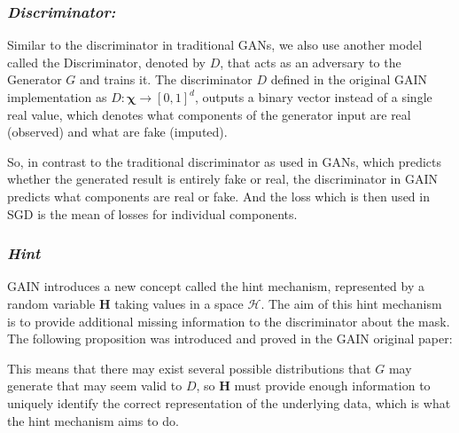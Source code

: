 \documentclass[conference]{IEEEtran}
\begin{document}
\subsubsection{\textit{Discriminator:}}

Similar to the discriminator in traditional GANs, we also use another model called the Discriminator, denoted by \( D \), that acts as an adversary to the Generator \( G \) and trains it. The discriminator \( D \) defined in the original GAIN implementation as \( D : \mathbf{\chi} \rightarrow [0,1]^d \), outputs a binary vector instead of a single real value, which denotes what components of the generator input are real (observed) and what are fake (imputed). 

So, in contrast to the traditional discriminator as used in GANs, which predicts whether the generated result is entirely fake or real, the discriminator in GAIN predicts what components are real or fake. And the loss which is then used in SGD is the mean of losses for individual components.

\subsubsection{\textit{Hint}}
GAIN introduces a new concept called the hint mechanism, represented by a random variable \( \mathbf{H} \) taking values in a space \( \mathcal{H} \). The aim of this hint mechanism is to provide additional missing information to the discriminator about the mask. The following proposition was introduced and proved in the GAIN\cite{gain} original paper:


This means that there may exist several possible distributions that \( G \) may generate that may seem valid to \( D \), so \( \mathbf{H} \) must provide enough information to uniquely identify the correct representation of the underlying data, which is what the hint mechanism aims to do.
\end{document}
